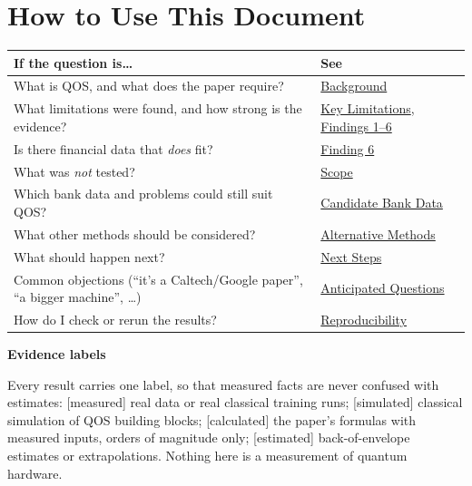 \documentclass[10pt]{article}
\newcommand{\subhead}[1]{%
    \par
    \vspace{6pt}%
    \textbf{#1}%
    \par
    \vspace{2pt}%
}
\newcommand{\evlabel}[1]{\textsf{\small[#1]}}
\newenvironment{sectionblock}
{%
    \par
    \vspace{2pt}
    \noindent
    \begin{minipage}{\textwidth}
}
{%
    \end{minipage}
    \par
    \vspace{5pt}
}
\begin{document}
\begin{sectionblock}

\section{How to Use This Document}

\begin{center}
\small
\begin{tabularx}{\textwidth}{@{}Yl@{}}
\toprule
\textbf{If the question is\ldots} & \textbf{See} \\
\midrule
What is QOS, and what does the paper require? & \hyperref[sec:qos]{Background} \\
What limitations were found, and how strong is the evidence? & \hyperref[sec:summary]{Key Limitations}, \hyperref[sec:f1]{Findings 1--6} \\
Is there financial data that \emph{does} fit? & \hyperref[sec:f6]{Finding 6} \\
What was \emph{not} tested? & \hyperref[sec:scope]{Scope} \\
Which bank data and problems could still suit QOS? & \hyperref[sec:data]{Candidate Bank Data} \\
What other methods should be considered? & \hyperref[sec:alt]{Alternative Methods} \\
What should happen next? & \hyperref[sec:next]{Next Steps} \\
Common objections (``it's a Caltech/Google paper'', ``a bigger machine'', \ldots) & \hyperref[sec:faq]{Anticipated Questions} \\
How do I check or rerun the results? & \hyperref[sec:repro]{Reproducibility} \\
\bottomrule
\end{tabularx}
\end{center}

\subhead{Evidence labels}

Every result carries one label, so that measured facts are never confused with estimates:
\evlabel{measured} real data or real classical training runs;
\evlabel{simulated} classical simulation of QOS building blocks;
\evlabel{calculated} the paper's formulas with measured inputs, orders of magnitude only;
\evlabel{estimated} back-of-envelope estimates or extrapolations.
Nothing here is a measurement of quantum hardware.

\end{sectionblock}
\end{document}
